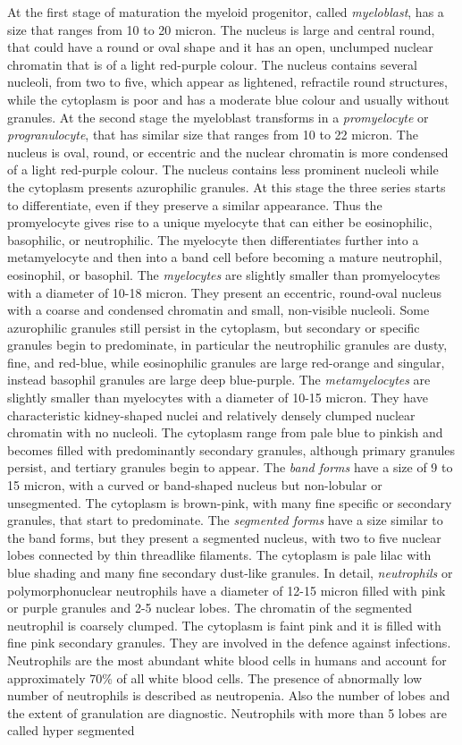\documentclass[final,a4paper,12pt,english]{UnicaPhdThesis3}
\begin{document}
	At the first stage of maturation the myeloid progenitor, called \textit{myeloblast}, has a size that ranges from 10 to 20 micron. The nucleus is large and central round, that could have a round or oval shape and it has an open, unclumped nuclear chromatin that is of a light red-purple colour. The nucleus contains several nucleoli, from two to five, which appear as lightened, refractile round structures, while the cytoplasm is poor and has a moderate blue colour and usually without granules. At the second stage the myeloblast transforms in a \textit{promyelocyte} or \textit{progranulocyte}, that has similar size that ranges from 10 to 22 micron. The nucleus is oval, round, or eccentric and the nuclear chromatin is more condensed of a light red-purple colour. The nucleus contains less prominent nucleoli while the cytoplasm presents azurophilic granules. At this stage the three series starts to differentiate, even if they preserve a similar appearance. Thus the promyelocyte gives rise to a unique myelocyte that can either be eosinophilic, basophilic, or neutrophilic. The myelocyte then differentiates further into a metamyelocyte and then into a band cell before becoming a mature neutrophil, eosinophil, or basophil. The \textit{myelocytes} are slightly smaller than promyelocytes with a diameter of 10-18 micron. They present an eccentric, round-oval nucleus with a coarse and condensed chromatin and small, non-visible nucleoli. Some azurophilic granules still persist in the cytoplasm, but secondary or specific granules begin to predominate, in particular the neutrophilic granules are dusty, fine, and red-blue, while eosinophilic granules are large red-orange and singular, instead basophil granules are large deep blue-purple. The \textit{metamyelocytes} are slightly smaller than myelocytes with a diameter of  10-15 micron. They have characteristic kidney-shaped nuclei and relatively densely clumped nuclear chromatin with no nucleoli. The cytoplasm range from pale blue to pinkish and becomes filled with predominantly secondary granules, although primary granules persist, and tertiary granules begin to appear. The \textit{band forms} have a size of 9 to 15 micron, with a curved or band-shaped nucleus but non-lobular or unsegmented. The cytoplasm is brown-pink, with many fine specific or secondary granules, that start to predominate. The \textit{segmented forms} have a size similar to the band forms, but they present a segmented nucleus, with two to five nuclear lobes connected by thin threadlike filaments. The cytoplasm is pale lilac with blue shading and many fine secondary dust-like granules. In detail, \textit{neutrophils} or polymorphonuclear neutrophils have a diameter of 12-15 micron filled with pink or purple granules and 2-5 nuclear lobes. The chromatin of the segmented neutrophil is coarsely clumped. The cytoplasm is faint pink and it is filled with fine pink secondary granules. They are involved in the defence against infections. Neutrophils are the most abundant white blood cells in humans and account for approximately 70\% of all white blood cells. The presence of abnormally low number of neutrophils is described as neutropenia. Also the number of lobes and the extent of granulation are diagnostic. Neutrophils with more than 5 lobes are called hyper segmented 
\end{document}
